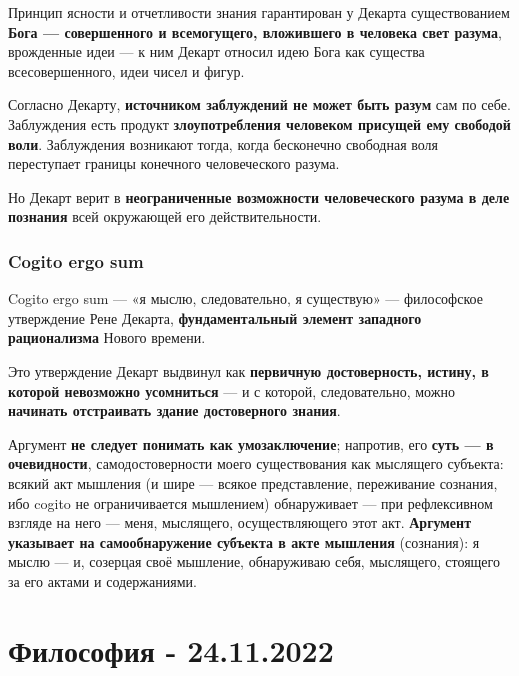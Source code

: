 \documentclass{article}
\begin{document}
\begin{flushleft}
\hfill

Принцип ясности и отчетливости знания гарантирован у Декарта существованием \textbf{Бога — совершенного и всемогущего, вложившего в человека свет разума}, врожденные идеи — к ним Декарт относил идею Бога как существа всесовершенного, идеи чисел и фигур.

\hfill

Согласно Декарту, \textbf{источником заблуждений не может быть разум} сам по себе. Заблуждения есть продукт \textbf{злоупотребления человеком присущей ему свободой воли}. Заблуждения возникают тогда, когда бесконечно свободная воля переступает границы конечного человеческого разума.

Но Декарт верит в \textbf{неограниченные возможности человеческого разума в деле познания} всей окружающей его действительности.

\subsubsection{Cogito ergo sum}

Cogito ergo sum — «я мыслю, следовательно, я существую» — философское утверждение Рене Декарта, \textbf{фундаментальный элемент западного рационализма} Нового времени.

\hfill

Это утверждение Декарт выдвинул как \textbf{первичную достоверность, истину, в которой невозможно усомниться} — и с которой, следовательно, можно \textbf{начинать отстраивать здание достоверного знания}.

\hfill

Аргумент \textbf{не следует понимать как умозаключение}; напротив, его \textbf{суть — в очевидности}, самодостоверности моего существования как мыслящего субъекта: всякий акт мышления (и шире — всякое представление, переживание сознания, ибо cogito не ограничивается мышлением) обнаруживает — при рефлексивном взгляде на него — меня, мыслящего, осуществляющего этот акт. \textbf{Аргумент указывает на самообнаружение субъекта в акте мышления} (сознания): я мыслю — и, созерцая своё мышление, обнаруживаю себя, мыслящего, стоящего за его актами и содержаниями.

\end{flushleft}

\pagebreak
\section{Философия - 24.11.2022}
\end{document}

